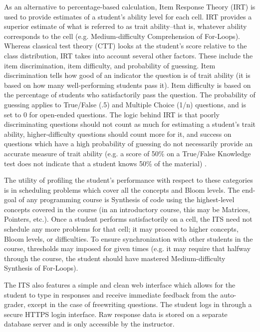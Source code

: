 \documentclass[hidelinks,11pt]{article}
\begin{document}
As an alternative to percentage-based calculation, Item Response Theory (IRT)
is used to provide estimates of a student's ability level for each cell.  IRT
provides a superior estimate of what is referred to as trait ability--that is,
whatever ability corresponds to the cell (e.g. Medium-difficulty Comprehension
of For-Loops). Whereas classical test theory (CTT) looks at the student's score
relative to the class distribution, IRT takes into account several other
factors. These include the item discrimination, item difficulty, and
probability of guessing. Item discrimination tells how good of an indicator the
question is of trait ability (it is based on how many well-performing students
pass it). Item difficulty is based on the percentage of students who
satisfactorily pass the question. The probability of guessing applies to
True/False (.5) and Multiple Choice (1/n) questions, and is set to 0 for
open-ended questions.  The logic behind IRT is that poorly discriminating
questions should not count as much for estimating a student's trait ability,
higher-difficulty questions should count more for it, and success on questions
which have a high probability of guessing do not necessarily provide an
accurate measure of trait ability (e.g. a score of 50\% on a True/False
Knowledge test does not indicate that a student knows 50\% of the material)
{\citep{embretson2000}}.

The utility of profiling the student's performance with respect to these
categories is in scheduling problems which cover all the concepts and Bloom
levels.  The end-goal of any programming course is Synthesis of code using the
highest-level concepts covered in the course (in an introductory course, this
may be Matrices, Pointers, etc.).  Once a student performs satisfactorily on a
cell, the ITS need not schedule any more problems for that cell; it may proceed
to higher concepts, Bloom levels, or difficulties.  To ensure synchronization
with other students in the course, thresholds may imposed for given times (e.g.
it may require that halfway through the course, the student should have
mastered Medium-difficulty Synthesis of For-Loops).

The ITS also features a simple and clean web interface which allows for the
student to type in responses and receive immediate feedback from the
auto-grader, except in the case of freewriting questions. The student logs in
through a secure HTTPS login interface. Raw response data is stored on a
separate database server and is only accessible by the instructor.
\end{document}
